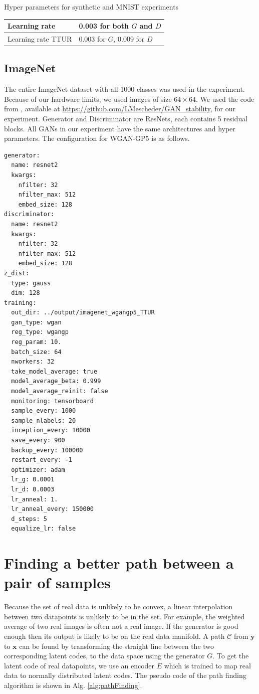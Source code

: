 \documentclass{article} %
\begin{document}
Hyper parameters for synthetic and MNIST experiments
\begin{center}
\begin{tabular}{|l|l|}
\hline
Learning rate & 0.003 for both $G$ and $D$ \\
\hline
Learning rate TTUR & 0.003 for $G$, 0.009 for $D$ \\
\hline
\end{tabular}
\end{center}

\subsection{ImageNet}
The entire ImageNet dataset with all 1000 classes was used in the experiment. Because of our hardware limits, we used images of size $64 \times 64$. We used the code from \cite{whichGANConverge}, available at \url{https://github.com/LMescheder/GAN_stability}, for our experiment. Generator and Discriminator are ResNets, each contains 5 residual blocks. All GANs in our experiment have the same architectures and hyper parameters. The configuration for WGAN-GP5 is as follows.

\begin{verbatim}
generator:
  name: resnet2
  kwargs:
    nfilter: 32
    nfilter_max: 512
    embed_size: 128
discriminator:
  name: resnet2
  kwargs:
    nfilter: 32
    nfilter_max: 512
    embed_size: 128
z_dist:
  type: gauss
  dim: 128
training:
  out_dir: ../output/imagenet_wgangp5_TTUR
  gan_type: wgan
  reg_type: wgangp
  reg_param: 10.
  batch_size: 64
  nworkers: 32
  take_model_average: true
  model_average_beta: 0.999
  model_average_reinit: false
  monitoring: tensorboard
  sample_every: 1000
  sample_nlabels: 20
  inception_every: 10000
  save_every: 900
  backup_every: 100000
  restart_every: -1
  optimizer: adam
  lr_g: 0.0001
  lr_d: 0.0003
  lr_anneal: 1.
  lr_anneal_every: 150000
  d_steps: 5
  equalize_lr: false
\end{verbatim}

\section{Finding a better path between a pair of samples}
\label{appx:pathFinding}
Because the set of real data is unlikely to be convex, a linear interpolation between two datapoints is unlikely to be in the set. For example, the weighted average of two real images is often not a real image. If the generator is good enough then its output is likely to be on the real data manifold. A path $\mathcal{C}$ from $\bm y$ to $\bm x$ can be found by transforming the straight line between the two corresponding latent codes, to the data space using the generator $G$. To get the latent code of real datapoints, we use an encoder $E$ which is trained to map real data to normally distributed latent codes. The pseudo code of the path finding algorithm is shown in Alg. \ref{alg:pathFinding}.
\end{document}
